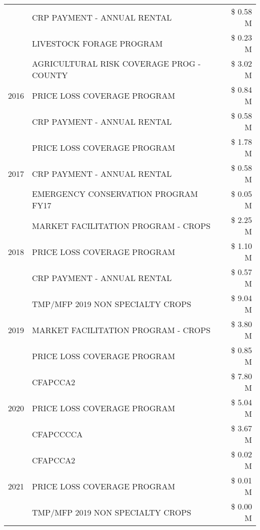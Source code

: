 \begin{tabular}{llr}
 & CRP PAYMENT - ANNUAL RENTAL & \$ 0.58 M \\
 & LIVESTOCK FORAGE PROGRAM & \$ 0.23 M \\
\cline{1-3}
\multirow[t]{3}{*}{2016} & AGRICULTURAL RISK COVERAGE PROG - COUNTY & \$ 3.02 M \\
 & PRICE LOSS COVERAGE PROGRAM & \$ 0.84 M \\
 & CRP PAYMENT - ANNUAL RENTAL & \$ 0.58 M \\
\cline{1-3}
\multirow[t]{3}{*}{2017} & PRICE LOSS COVERAGE PROGRAM & \$ 1.78 M \\
 & CRP PAYMENT - ANNUAL RENTAL & \$ 0.58 M \\
 & EMERGENCY CONSERVATION PROGRAM FY17 & \$ 0.05 M \\
\cline{1-3}
\multirow[t]{3}{*}{2018} & MARKET FACILITATION PROGRAM - CROPS & \$ 2.25 M \\
 & PRICE LOSS COVERAGE PROGRAM & \$ 1.10 M \\
 & CRP PAYMENT - ANNUAL RENTAL & \$ 0.57 M \\
\cline{1-3}
\multirow[t]{3}{*}{2019} & TMP/MFP 2019 NON SPECIALTY CROPS & \$ 9.04 M \\
 & MARKET FACILITATION PROGRAM - CROPS & \$ 3.80 M \\
 & PRICE LOSS COVERAGE PROGRAM & \$ 0.85 M \\
\cline{1-3}
\multirow[t]{3}{*}{2020} & CFAPCCA2 & \$ 7.80 M \\
 & PRICE LOSS COVERAGE PROGRAM & \$ 5.04 M \\
 & CFAPCCCCA & \$ 3.67 M \\
\cline{1-3}
\multirow[t]{3}{*}{2021} & CFAPCCA2 & \$ 0.02 M \\
 & PRICE LOSS COVERAGE PROGRAM & \$ 0.01 M \\
 & TMP/MFP 2019 NON SPECIALTY CROPS & \$ 0.00 M \\
\cline{1-3}
\bottomrule
\end{tabular}
